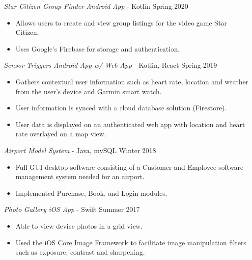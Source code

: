 \documentclass[margin]{res}
\begin{document}
\begin{resume}
\begin{itemize}
				\end{itemize}
				
				{\sl Star Citizen Group Finder Android App} - Kotlin \hfill            Spring 2020
				\begin{itemize}  \itemsep -2pt %
					\item Allows users to create and view group listings for the video game Star Citizen.
					\item Uses Google's Firebase for storage and authentication.

				\end{itemize}
				
				{\sl Sensor Triggers Android App w/ Web App} - Kotlin, React \hfill Spring 2019
                 \begin{itemize}  \itemsep -2pt %
                 \item Gathers contextual user information such as heart rate, location and weather from the user's device and Garmin smart watch.
                \item   User information is synced with a cloud database solution (Firestore).
                \item User data is displayed on an authenticated web app with location and heart rate overlayed on a map view.
                \end{itemize}

                {\sl Airport Model System} - Java, mySQL \hfill        Winter 2018
                  \begin{itemize}
                   \item Full GUI desktop software consisting of a Customer and Employee software management system needed for an airport.
                   \item Implemented Purchase, Book, and Login modules.
                   \end{itemize}
               
                {\sl Photo Gallery iOS App} - Swift \hfill            Summer 2017
               \begin{itemize}  \itemsep -2pt %
               	\item Able to view device photos in a grid view.
               	\item Used the iOS Core Image Framework to facilitate image manipulation filters such as exposure, contrast and sharpening.
               \end{itemize}


\end{resume}
\end{document}
